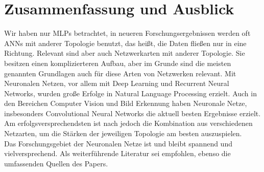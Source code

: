 \section{Zusammenfassung und Ausblick}

Wir haben nur MLPs betrachtet, in neueren Forschungsergebnissen werden oft ANNs mit anderer Topologie benutzt, das heißt, die Daten fließen nur in eine Richtung. Relevant sind aber auch Netzwerkarten mit anderer Topologie. Sie besitzen einen komplizierteren Aufbau, aber im Grunde sind die meisten genannten Grundlagen auch für diese Arten von Netzwerken relevant. 
Mit Neuronalen Netzen, vor allem mit Deep Learning und Recurrent Neural Networks, wurden große Erfolge in Natural Language Processing erzielt. Auch in den Bereichen Computer Vision und Bild Erkennung haben Neuronale Netze, insbesonders Convolutional Neural Networks die aktuell besten Ergebnisse erzielt. Am erfolgsversprechendsten ist nach \cite{LeCun2015} jedoch die Kombination aus verschiedenen Netzarten, um die Stärken der jeweiligen Topologie am besten auszuspielen. \\

Das Forschungsgebiet der Neuronalen Netze ist und bleibt spannend und vielversprechend. Als weiterführende Literatur sei \cite{LeCun2015} empfohlen, ebenso die umfassenden Quellen des Papers.


